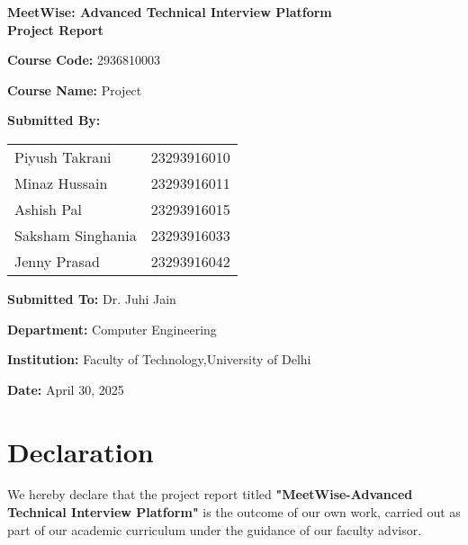 \documentclass[12pt,a4paper]{report}
\begin{document}
\begin{titlepage}
\begin{center}
\vspace*{2cm}
{\LARGE\bfseries MeetWise: Advanced Technical Interview Platform\\Project Report\par}
\vspace{2cm}
{\large\textbf{Course Code:} 2936810003\par}
{\large\textbf{Course Name:} Project \par}
\vspace{1.5cm}
{\large\textbf{Submitted By:}\\[0.5em]
\begin{tabular}{ll}
Piyush Takrani      & 23293916010 \\
Minaz Hussain       & 23293916011 \\
Ashish Pal          & 23293916015 \\
Saksham Singhania   & 23293916033 \\
Jenny Prasad        & 23293916042 \\
\end{tabular}
\par}

\vspace{0.5cm}
{\large\textbf{Submitted To:} Dr. Juhi Jain\par}
\vspace{1.5cm}
{\large\textbf{Department:} Computer Engineering\par}
{\large\textbf{Institution:} Faculty of Technology,University of Delhi\par}
\vspace{1.5cm}
{\large\textbf{Date:} April 30, 2025\par}
\end{center}
\end{titlepage}

\tableofcontents
\clearpage

\chapter*{Declaration}
We hereby declare that the project report titled \textbf{"MeetWise-Advanced Technical Interview Platform"} is the outcome of our own work, carried out as part of our academic curriculum under the guidance of our faculty advisor.
\\
\end{document}
